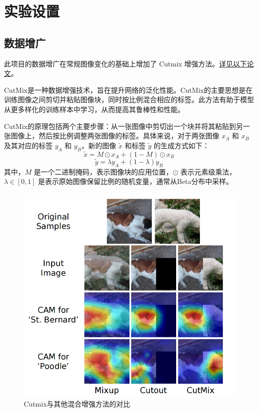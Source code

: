 \documentclass[notitlepage,cs4size,punct,oneside]{ctexrep}
\numberwithin{equation}{chapter}
\theoremstyle{mystyle}
\begin{document}
\section{实验设置}
\subsection{数据增广}
此项目的数据增广在常规图像变化的基础上增加了 Cutmix 增强方法。\href{http://openaccess.thecvf.com/content_ICCV_2019/papers/Yun_CutMix_Regularization_Strategy_to_Train_Strong_Classifiers_With_Localizable_Features_ICCV_2019_paper.pdf}{详见以下论文}。

CutMix是一种数据增强技术，旨在提升网络的泛化性能。CutMix的主要思想是在训练图像之间剪切并粘贴图像块，同时按比例混合相应的标签。此方法有助于模型从更多样化的训练样本中学习，从而提高其鲁棒性和性能。

CutMix的原理包括两个主要步骤：从一张图像中剪切出一个块并将其粘贴到另一张图像上，然后按比例调整两张图像的标签。具体来说，对于两张图像 $x_A$ 和 $x_B$ 及其对应的标签 $y_A$ 和 $y_B$，新的图像 $\tilde{x}$ 和标签 $\tilde{y}$ 的生成方式如下：
\begin{equation}
\tilde{x} = M \odot x_A + (1 - M) \odot x_B
\end{equation}
\begin{equation}
\tilde{y} = \lambda y_A + (1 - \lambda) y_B
\end{equation}
其中，$M$ 是一个二进制掩码，表示图像块的应用位置，$\odot$ 表示元素级乘法，$\lambda \in [0, 1]$ 是表示原始图像保留比例的随机变量，通常从Beta分布中采样。
\begin{figure}[H]
    \centering
    \includegraphics[scale=0.7]{cutmix.png}
    \caption{Cutmix与其他混合增强方法的对比}
\end{figure}
\end{document}
